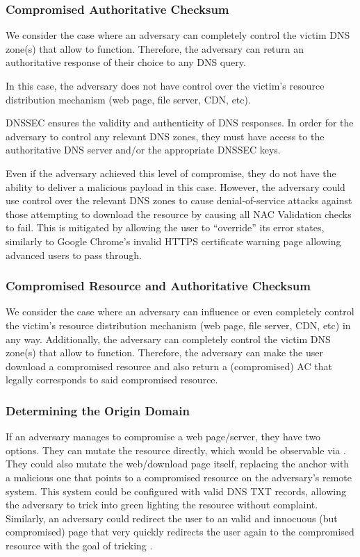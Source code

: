 \subsubsection{Compromised Authoritative Checksum}

We consider the case where an adversary can completely control the victim DNS
zone(s) that allow \SYSTEM{} to function. Therefore, the adversary can return an
authoritative response of their choice to any DNS query.

In this case, the adversary does not have control over the victim's resource
distribution mechanism (web page, file server, CDN, etc).

DNSSEC ensures the validity and authenticity of DNS responses. In order for the
adversary to control any relevant DNS zones, they must have access to the
authoritative DNS server and/or the appropriate DNSSEC keys.

Even if the adversary achieved this level of compromise, they do not have the
ability to deliver a malicious payload in this case. However, the adversary
could use control over the relevant DNS zones to cause denial-of-service attacks
against those attempting to download the resource by causing all NAC Validation
checks to fail. This is mitigated by \SYSTEM{} allowing the user to ``override''
its error states, similarly to Google Chrome's invalid HTTPS certificate warning
page allowing advanced users to pass through.

\subsubsection{Compromised Resource and Authoritative Checksum}

We consider the case where an adversary can influence or even completely control
the victim's resource distribution mechanism (web page, file server, CDN, etc)
in any way. Additionally, the adversary can completely control the victim DNS
zone(s) that allow \SYSTEM{} to function. Therefore, the adversary can make the
user download a compromised resource and also return a (compromised) AC that
legally corresponds to said compromised resource.

\subsubsection{Determining the Origin Domain}

If an adversary manages to compromise a web page/server, they have two options.
They can mutate the resource directly, which would be observable via \SYSTEM{}.
They could also mutate the web/download page itself, replacing the anchor with a
malicious one that points to a compromised resource on the adversary's remote
system. This system could be configured with valid \SYSTEM{} DNS TXT records,
allowing the adversary to trick \SYSTEM{} into green lighting the resource
without complaint. Similarly, an adversary could redirect the user to an valid
and innocuous (but compromised) page that very quickly redirects the user again
to the compromised resource with the goal of tricking \SYSTEM{}.

